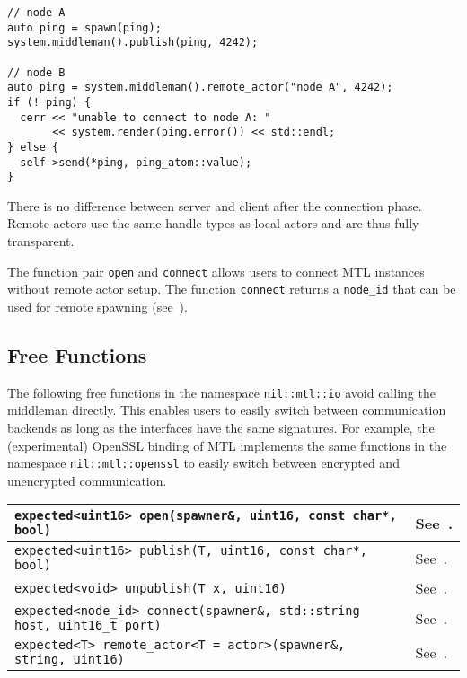 \begin{lstlisting}
// node A
auto ping = spawn(ping);
system.middleman().publish(ping, 4242);

// node B
auto ping = system.middleman().remote_actor("node A", 4242);
if (! ping) {
  cerr << "unable to connect to node A: "
       << system.render(ping.error()) << std::endl;
} else {
  self->send(*ping, ping_atom::value);
}
\end{lstlisting}

There is no difference between server and client after the connection phase.
Remote actors use the same handle types as local actors and are thus fully
transparent.

The function pair \lstinline^open^ and \lstinline^connect^ allows users to
connect MTL instances without remote actor setup. The function
\lstinline^connect^ returns a \lstinline^node_id^ that can be used for remote
spawning (see~).

\subsection{Free Functions}
\label{free-remoting-functions}

The following free functions in the namespace \lstinline^nil::mtl::io^ avoid calling
the middleman directly. This enables users to easily switch between
communication backends as long as the interfaces have the same signatures. For
example, the (experimental) OpenSSL binding of MTL implements the same
functions in the namespace \lstinline^nil::mtl::openssl^ to easily switch between
encrypted and unencrypted communication.

\begin{center}
\begin{tabular}{ll}
  \hline
  \lstinline^expected<uint16> open(spawner&, uint16, const char*, bool)^ & See~. \\
  \hline
  \lstinline^expected<uint16> publish(T, uint16, const char*, bool)^ & See~. \\
  \hline
  \lstinline^expected<void> unpublish(T x, uint16)^ & See~. \\
  \hline
  \lstinline^expected<node_id> connect(spawner&, std::string host, uint16_t port)^ & See~. \\
  \hline
  \lstinline^expected<T> remote_actor<T = actor>(spawner&, string, uint16)^ & See~. \\
  \hline
\end{tabular}
\end{center}

